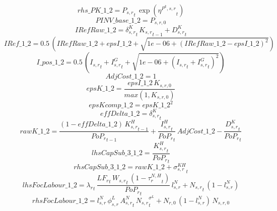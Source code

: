 \begin{dmath*}
rhs\_PK\_1\_2 = {{P_{s,r}}}_{t}\, \exp\left({{\eta^{P^k,s,r}}}_{t}\right)
\end{dmath*}
\begin{dmath*}
PINV\_base\_1\_2 = {{P_{s,r,0}}}
\end{dmath*}
\begin{dmath*}
IRefRaw\_1\_2 = {{\delta^{K}_{s,r}}}_{t}\, {{K_{s,r}}}_{t-1}+{{D^K_{s,r}}}_{t}
\end{dmath*}
\begin{dmath*}
IRef\_1\_2 = 0.5\, \left({IRefRaw\_1\_2}+{epsI\_1\_2}+\sqrt{1e-06+\left({IRefRaw\_1\_2}-{epsI\_1\_2}\right)^{2}}\right)
\end{dmath*}
\begin{dmath*}
I\_pos\_1\_2 = 0.5\, \left({{I_{s,r}}}_{t}+{{I^G_{s,r}}}_{t}+\sqrt{1e-06+\left({{I_{s,r}}}_{t}+{{I^G_{s,r}}}_{t}\right)^{2}}\right)
\end{dmath*}
\begin{dmath*}
AdjCost\_1\_2 = 1
\end{dmath*}
\begin{dmath*}
epsK\_1\_2 = \frac{{epsI\_1\_2}\, {{K_{s,r,0}}}}{max(1,{{K_{s,r,0}}})}
\end{dmath*}
\begin{dmath*}
epsKcomp\_1\_2 = {epsK\_1\_2}^{2}
\end{dmath*}
\begin{dmath*}
effDelta\_1\_2 = {{\delta^{K}_{s,r}}}_{t}
\end{dmath*}
\begin{dmath*}
rawK\_1\_2 = \frac{\left(1-{effDelta\_1\_2}\right)\, {{K^H_{s,r}}}_{t-1}}{{{PoP_r}}_{t-1}}+\frac{{{I^H_{s,r}}}_{t}}{{{PoP_r}}_{t}}\, {AdjCost\_1\_2}-\frac{{{D^K_{s,r}}}_{t}}{{{PoP_r}}_{t}}
\end{dmath*}
\begin{dmath*}
lhsCapSub\_3\_1\_2 = \frac{{{K^H_{s,r}}}_{t}}{{{PoP_r}}_{t}}
\end{dmath*}
\begin{dmath*}
rhsCapSub\_3\_1\_2 = {rawK\_1\_2}+{{\sigma^{KH}_{s,r}}}_{t}
\end{dmath*}
\begin{dmath*}
lhsFocLabour\_1\_2 = {\lambda_r}_{t}\, \frac{{{LF_r}}_{t}\, {{W_{s,r}}}_{t}\, \left(1-{{\tau^{N,H}_{r}}}_{t}\right)}{{{PoP_r}}_{t}}\, {{l^{N}_{s,r}}}+{{N_{s,r}}}_{t}\, \left(1-{{l^{N}_{s,r}}}\right)
\end{dmath*}
\begin{dmath*}
rhsFocLabour\_1\_2 = {{l^{N}_{s,r}}}\, {{\phi^{L}_{s,r}}}\, {{A^{N}_{s,r}}}_{t}\, {{N_{s,r}}}_{t}^{{{\sigma^{L}}}}+{{N_{r,0}}}\, \left(1-{{l^{N}_{s,r}}}\right)\, {{N_{s,r,0}}}
\end{dmath*}

